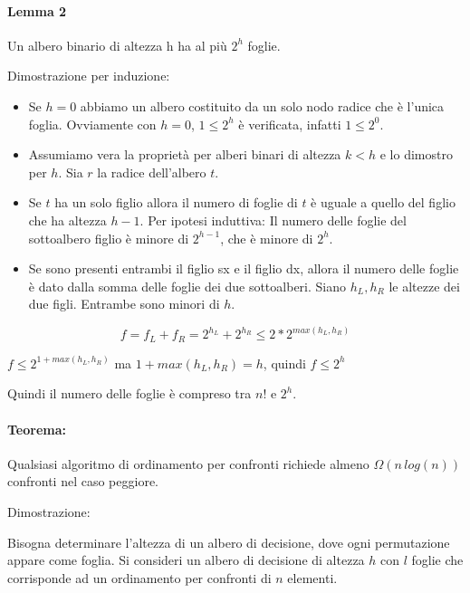 \paragraph{Lemma 2}

{Un albero binario di altezza h ha al più $2^h$ foglie.}

{Dimostrazione per induzione:}

\begin{itemize}
\tightlist
\item
  {Se $h=0$ abbiamo un albero costituito da un solo nodo radice che è l'unica foglia. Ovviamente con $h=0$, $1 \leq 2^h$ è verificata, infatti $1\leq 2^0$.}
\item
  {Assumiamo vera la proprietà per alberi binari di altezza $k<h$ e lo dimostro per $h$. Sia $r$ la radice dell'albero $t$. }
\end{itemize}

\begin{itemize}
\tightlist
\item
  {Se $t$ ha un solo figlio allora il numero di foglie di $t$ è uguale a quello del figlio che ha altezza $h-1$. }{Per ipotesi induttiva}{: Il numero delle foglie del sottoalbero figlio è minore di $2^{h-1}$, che è minore di $2^h$.}
\item
  {Se sono presenti entrambi il figlio sx e il figlio dx, allora il numero delle foglie è dato dalla somma delle foglie dei due sottoalberi. Siano $h_L,h_R$ le altezze dei due figli. Entrambe sono minori di $h$.}
\end{itemize}

\begin{equation}
f=f_L+f_R = 2^{h_L} + 2^{h_R} \leq 2 * 2^{max(h_L,h_R)}
\end{equation}

{$f \leq 2^{1+max(h_L,h_R)}$ ma $1+max(h_L,h_R) = h$, quindi $f \leq 2^h$}

{Quindi il numero delle foglie è compreso tra $n!$ e $2^h$.}

\paragraph{Teorema:}

{Qualsiasi algoritmo di ordinamento per confronti richiede almeno $\Omega(n\,log(n))$ confronti nel caso peggiore.}

{Dimostrazione:}

{Bisogna determinare l'altezza di un albero di decisione, dove ogni permutazione appare come foglia. Si consideri un albero di decisione di altezza $h$ con $l$ foglie che corrisponde ad un ordinamento per confronti di $n$ elementi. }

